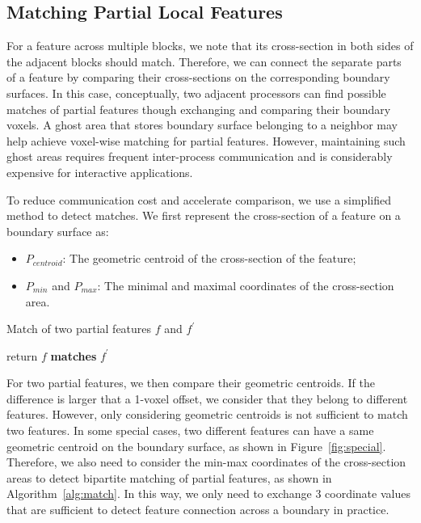 \subsection{Matching Partial Local Features}

For a feature across multiple blocks, we note that its cross-section in both sides of the adjacent blocks should match. Therefore, we can connect the separate parts of a feature by comparing their cross-sections on the corresponding boundary surfaces. In this case, conceptually, two adjacent processors can find possible matches of partial features though exchanging and comparing their boundary voxels. A ghost area that stores boundary surface belonging to a neighbor may help achieve voxel-wise matching for partial features. However, maintaining such ghost areas requires frequent inter-process communication and is considerably expensive for interactive applications. 

To reduce communication cost and accelerate comparison, we use a simplified method to detect matches. We first represent the cross-section of a feature on a boundary surface as:

\begin{itemize}

\item $P_{centroid}$: The geometric centroid of the cross-section of the feature;

\item $P_{min}$ and $P_{max}$: The minimal and maximal coordinates of the cross-section area.

\end{itemize}

\begin{algorithm}[t]
\caption{Match of two partial features $f$ and $f^{'}$}
	\begin{algorithmic}
			\STATE return $f$ \textbf{matches} $f^{'}$
		\ENDIF
	\end{algorithmic}
\label{alg:match}
\end{algorithm}

For two partial features, we then compare their geometric centroids. If the difference is larger that a 1-voxel offset, we consider that they belong to different features. However, only considering geometric centroids is not sufficient to match two features. In some special cases, two different features can have a same geometric centroid on the boundary surface, as shown in Figure~\ref{fig:special}. Therefore, we also need to consider the min-max coordinates of the cross-section areas to detect bipartite matching of partial features, as shown in Algorithm~\ref{alg:match}. In this way, we only need to exchange 3 coordinate values that are sufficient to detect feature connection across a boundary in practice.

